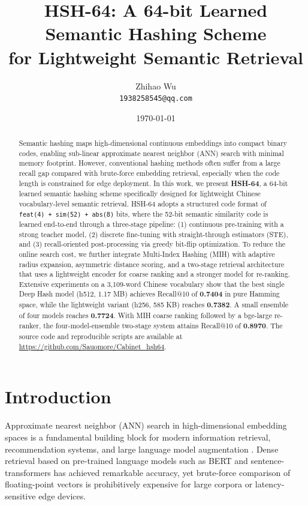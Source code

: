 \documentclass[11pt,a4paper]{article}
\title{
\textbf{HSH-64: A 64-bit Learned Semantic Hashing Scheme}\\
\textbf{for Lightweight Semantic Retrieval}
}
\author{
  Zhihao Wu \\
  \texttt{1938258545@qq.com}
}
\date{\today}
\begin{document}
\maketitle

\begin{abstract}
Semantic hashing maps high-dimensional continuous embeddings into compact binary codes, enabling sub-linear approximate nearest neighbor (ANN) search with minimal memory footprint. However, conventional hashing methods often suffer from a large recall gap compared with brute-force embedding retrieval, especially when the code length is constrained for edge deployment. In this work, we present \textbf{HSH-64}, a 64-bit learned semantic hashing scheme specifically designed for lightweight Chinese vocabulary-level semantic retrieval. HSH-64 adopts a structured code format of \texttt{feat(4) + sim(52) + abs(8)} bits, where the 52-bit semantic similarity code is learned end-to-end through a three-stage pipeline: (1) continuous pre-training with a strong teacher model, (2) discrete fine-tuning with straight-through estimators (STE), and (3) recall-oriented post-processing via greedy bit-flip optimization. To reduce the online search cost, we further integrate Multi-Index Hashing (MIH) with adaptive radius expansion, asymmetric distance scoring, and a two-stage retrieval architecture that uses a lightweight encoder for coarse ranking and a stronger model for re-ranking. Extensive experiments on a 3,109-word Chinese vocabulary show that the best single Deep Hash model (h512, 1.17 MB) achieves Recall@10 of \textbf{0.7404} in pure Hamming space, while the lightweight variant (h256, 585 KB) reaches \textbf{0.7382}. A small ensemble of four models reaches \textbf{0.7724}. With MIH coarse ranking followed by a bge-large re-ranker, the four-model-ensemble two-stage system attains Recall@10 of \textbf{0.8970}. The source code and reproducible scripts are available at \url{https://github.com/Sauomore/Cabinet_hsh64}.
\end{abstract}

\section{Introduction}

Approximate nearest neighbor (ANN) search in high-dimensional embedding spaces is a fundamental building block for modern information retrieval, recommendation systems, and large language model augmentation \citep{jegou2011product,guo2020deep}. Dense retrieval based on pre-trained language models such as BERT \citep{devlin2019bert} and sentence-transformers \citep{reimers2019sentence} has achieved remarkable accuracy, yet brute-force comparison of floating-point vectors is prohibitively expensive for large corpora or latency-sensitive edge devices.
\end{document}
